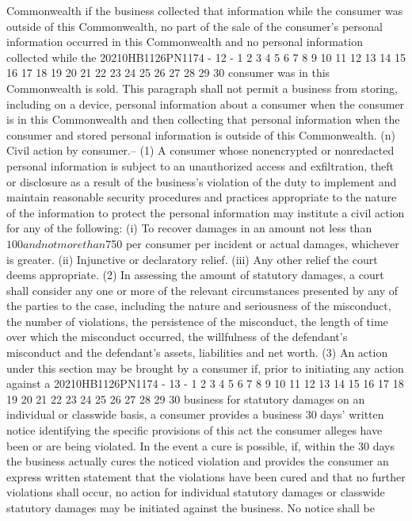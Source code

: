 Commonwealth if the business collected that information while
the consumer was outside of this Commonwealth, no part of the
sale of the consumer's personal information occurred in this
Commonwealth and no personal information collected while the
20210HB1126PN1174 - 12 -
1
2
3
4
5
6
7
8
9
10
11
12
13
14
15
16
17
18
19
20
21
22
23
24
25
26
27
28
29
30
consumer was in this Commonwealth is sold. This paragraph
shall not permit a business from storing, including on a
device, personal information about a consumer when the
consumer is in this Commonwealth and then collecting that
personal information when the consumer and stored personal
information is outside of this Commonwealth.
(n) Civil action by consumer.--
(1) A consumer whose nonencrypted or nonredacted
personal information is subject to an unauthorized access and
exfiltration, theft or disclosure as a result of the
business's violation of the duty to implement and maintain
reasonable security procedures and practices appropriate to
the nature of the information to protect the personal
information may institute a civil action for any of the
following:
(i) To recover damages in an amount not less than
$100 and not more than $750 per consumer per incident or
actual damages, whichever is greater.
(ii) Injunctive or declaratory relief.
(iii) Any other relief the court deems appropriate.
(2) In assessing the amount of statutory damages, a
court shall consider any one or more of the relevant
circumstances presented by any of the parties to the case,
including the nature and seriousness of the misconduct, the
number of violations, the persistence of the misconduct, the
length of time over which the misconduct occurred, the
willfulness of the defendant's misconduct and the defendant's
assets, liabilities and net worth.
(3) An action under this section may be brought by a
consumer if, prior to initiating any action against a
20210HB1126PN1174 - 13 -
1
2
3
4
5
6
7
8
9
10
11
12
13
14
15
16
17
18
19
20
21
22
23
24
25
26
27
28
29
30
business for statutory damages on an individual or classwide
basis, a consumer provides a business 30 days' written notice
identifying the specific provisions of this act the consumer
alleges have been or are being violated. In the event a cure
is possible, if, within the 30 days the business actually
cures the noticed violation and provides the consumer an
express written statement that the violations have been cured
and that no further violations shall occur, no action for
individual statutory damages or classwide statutory damages
may be initiated against the business. No notice shall be
